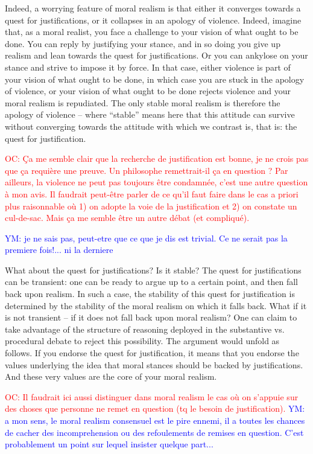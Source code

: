 \documentclass[preprint,11pt]{elsarticle}
\newcommand{\commentYM}[1]{\textcolor{blue}{YM: #1}}
\newcommand{\commentOC}[1]{\textcolor{red}{OC: #1}}
\begin{document}
Indeed, a worrying feature of moral realism is that either it converges towards a quest for justifications, or it collapses in an apology of violence. Indeed, imagine that, as a moral realist, you face a challenge to your vision of what ought to be done. You can reply by justifying your stance, and in so doing you give up realism and lean towards the quest for justifications. Or you can ankylose on your stance and strive to impose it by force. In that case, either violence is part of your vision of what ought to be done, in which case you are stuck in the apology of violence, or your vision of what ought to be done rejects violence and your moral realism is repudiated. The only stable moral realism is therefore the apology of violence -- where ``stable'' means here that this attitude can survive without converging towards the attitude with which we contrast is, that is: the quest for justification.

\commentOC{ Ça me semble clair que la
recherche de justification est bonne, je ne crois pas que ça
requière une preuve. Un philosophe remettrait-il ça en
question ? Par ailleurs, la violence ne peut pas toujours être
condamnée, c’est une autre question à mon avis. Il faudrait
peut-être parler de ce qu’il faut faire dans le cas a priori plus
raisonnable où 1) on adopte la voie de la justification et 2)
on constate un cul-de-sac. Mais ça me semble être un autre
débat (et compliqué).}

\commentYM{je ne sais pas, peut-etre que ce que je dis est trivial. Ce ne serait pas la premiere fois!... ni la derniere}

What about the quest for justifications? Is it stable? The quest for justifications can be transient: one can be ready to argue up to a certain point, and then fall back upon realism. In such a case, the stability of this quest for justification is determined by the stability of the moral realism on which it falls back. What if it is not transient -- if it does not fall back upon moral realism? One can claim to take advantage of the structure of reasoning deployed in the substantive vs. procedural debate to reject this possibility. The argument would unfold as follows. If you endorse the quest for justification, it means that you endorse the values underlying the idea that moral stances should be backed by justifications. And these very values are the core of your moral realism.

\commentOC{Il faudrait ici aussi distinguer
dans moral realism le cas où on s’appuie sur des choses que
personne ne remet en question (tq le besoin de
justification).}
\commentYM{a mon sens, le moral realism consensuel est le pire ennemi, il a toutes les chances de cacher des incomprehension ou des refoulements de remises en question. C'est probablement un point sur lequel insister quelque part...}
\end{document}
